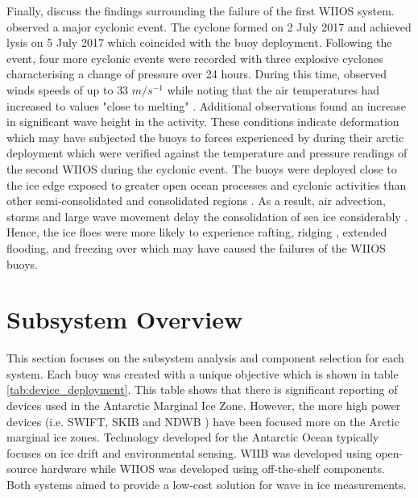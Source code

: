 Finally, \textcite{vichi2019effects} discuss the findings surrounding the failure of the first WIIOS system. \textcite{vichi2019effects} observed a major cyclonic event. The cyclone formed on  2 July 2017 and achieved lysis on 5 July 2017 which coincided with the buoy deployment. Following the event, four more cyclonic events were recorded with three explosive cyclones \cite{vichi2019effects} characterising a change of pressure over 24 hours. During this time, \textcite{vichi2019effects} observed winds speeds of up to $33$ $m/s^{-1}$ while noting that the air temperatures had increased to values "close to melting" \cite{vichi2019effects}. Additional observations found an increase in significant wave height in the activity. These conditions indicate deformation \cite{vichi2019effects} which may have subjected the buoys to forces experienced by \cite{doble2017robust} during their arctic deployment which were verified against the temperature and pressure readings of the second WIIOS during the cyclonic event. The buoys were deployed close to the ice edge exposed to greater open ocean processes and cyclonic activities than other semi-consolidated and consolidated regions \cite{vichi2019effects}. As a result, air advection, storms and large wave movement delay the consolidation of sea ice considerably \cite{vichi2019effects}. Hence, the ice floes were more likely to experience rafting, ridging \cite{icedefinition1992}, extended flooding, and freezing over which may have caused the failures of the WIIOS buoys.
\newpage
\section{Subsystem Overview}

This section focuses on the subsystem analysis and component selection for each system. Each buoy was created with a unique objective which is shown in table \ref{tab:device_deployment}. This table shows that there is significant reporting of devices used in the Antarctic Marginal Ice Zone. However, the more high power devices (i.e. SWIFT, SKIB and NDWB ) have been focused more on the Arctic marginal ice zones. Technology developed for the Antarctic Ocean typically focuses on ice drift and environmental sensing. WIIB was developed using open-source hardware while WIIOS was developed using off-the-shelf components. Both systems aimed to provide a low-cost solution for wave in ice measurements.


